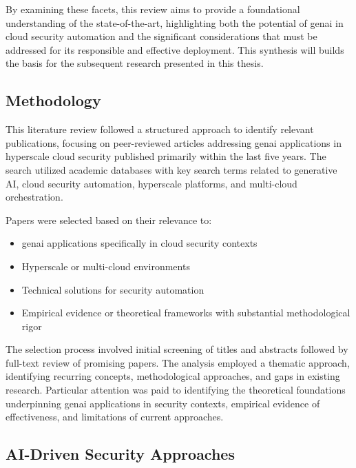 By examining these facets, this review aims to provide a foundational understanding of the state-of-the-art, highlighting both the potential of \gls{genai} in cloud security automation and the significant considerations that must be addressed for its responsible and effective deployment. This synthesis will builds the basis for the subsequent research presented in this thesis.

\subsection{Methodology} %
\label{sec:Methodology}

This literature review followed a structured approach to identify relevant publications, focusing on peer-reviewed articles addressing \gls{genai} applications in hyperscale cloud security published primarily within the last five years. The search utilized academic databases with key search terms related to generative AI, cloud security automation, hyperscale platforms, and multi-cloud orchestration.

Papers were selected based on their relevance to:

\begin{itemize}
\item \gls{genai} applications specifically in cloud security contexts
\item Hyperscale or multi-cloud environments
\item Technical solutions for security automation
\item Empirical evidence or theoretical frameworks with substantial methodological rigor
\end{itemize}

The selection process involved initial screening of titles and abstracts followed by full-text review of promising papers. The analysis employed a thematic approach, identifying recurring concepts, methodological approaches, and gaps in existing research. Particular attention was paid to identifying the theoretical foundations underpinning \gls{genai} applications in security contexts, empirical evidence of effectiveness, and limitations of current approaches.


\subsection{AI-Driven Security Approaches} %
\label{sec:AI-Driven Security Approaches}

